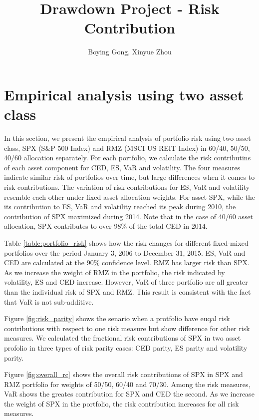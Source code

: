 \documentclass[11pt]{article}
\title{Drawdown Project - Risk Contribution}
\author{Boying Gong, Xinyue Zhou}
\begin{document}
\maketitle

\tableofcontents

\clearpage

\section{Empirical analysis using two asset class}

In this section, we present the empirical analysis of portfolio risk using two asset class, SPX (S\&P 500 Index) and RMZ (MSCI US REIT Index) in 60/40, 50/50, 40/60 allocation separately. For each portfolio, we calculate the risk contributins of each asset component for CED, ES, VaR and volatility. The four measures indicate similar risk of portfolios over time, but large differences when it comes to risk contributions. The variation of risk contributions for ES, VaR and volatility resemble each other under fixed asset allocation weights. For asset SPX, while the its contribution to ES, VaR and volatility reached its peak during 2010, the contribution of SPX maximized during 2014. Note that in the case of 40/60 asset allocation, SPX contributes to over 98\% of the total CED in 2014. 

Table \ref{table:portfolio_risk} shows how the risk changes for different fixed-mixed portfolios over the period January 3, 2006 to December 31, 2015. ES, VaR and CED are calculated at the 90\% confidence level. RMZ has larger risk than SPX. As we increase the weight of RMZ in the portfolio, the risk indicated by volatility, ES and CED increase. However, VaR of three portfolio are all greater than the individual risk of SPX and RMZ. This result is consistent with the fact that VaR is not sub-additive.

Figure \ref{fig:risk_parity} shows the senario when a protfolio have euqal risk contributions with respect to one risk measure but show difference for other risk measures. We calculated the fractional risk contributions of SPX in two asset profolio in three types of risk parity cases: CED parity, ES parity and volatility parity.

Figure \ref{fig:overall_rc} shows the overall risk contributions of SPX in SPX and RMZ portfolio for weights of 50/50, 60/40 and 70/30. Among the risk measures, VaR shows the greates contribution for SPX and CED the second. As we increase the weight of SPX in the portfolio, the risk contribution increases for all risk measures. 
\end{document}

